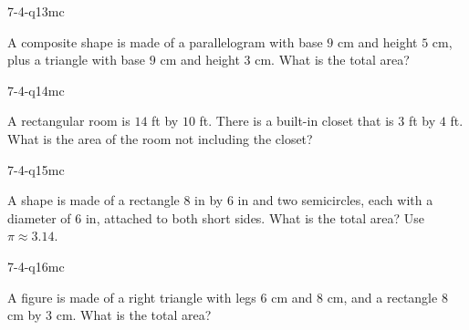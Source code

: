 \begin{practiceQuestion}{7-4-q13}{mc}
\begin{questionText}
A composite shape is made of a parallelogram with base $9$ cm and height $5$ cm, plus a triangle with base $9$ cm and height $3$ cm. What is the total area?
\end{questionText}
\end{practiceQuestion}

\begin{practiceQuestion}{7-4-q14}{mc}
\begin{questionText}
A rectangular room is $14$ ft by $10$ ft. There is a built-in closet that is $3$ ft by $4$ ft. What is the area of the room not including the closet?
\end{questionText}
\end{practiceQuestion}

\begin{practiceQuestion}{7-4-q15}{mc}
\begin{questionText}
A shape is made of a rectangle $8$ in by $6$ in and two semicircles, each with a diameter of $6$ in, attached to both short sides. What is the total area? Use $\pi \approx 3.14$.
\end{questionText}
\end{practiceQuestion}

\begin{practiceQuestion}{7-4-q16}{mc}
\begin{questionText}
A figure is made of a right triangle with legs $6$ cm and $8$ cm, and a rectangle $8$ cm by $3$ cm. What is the total area?
\end{questionText}
\end{practiceQuestion}

